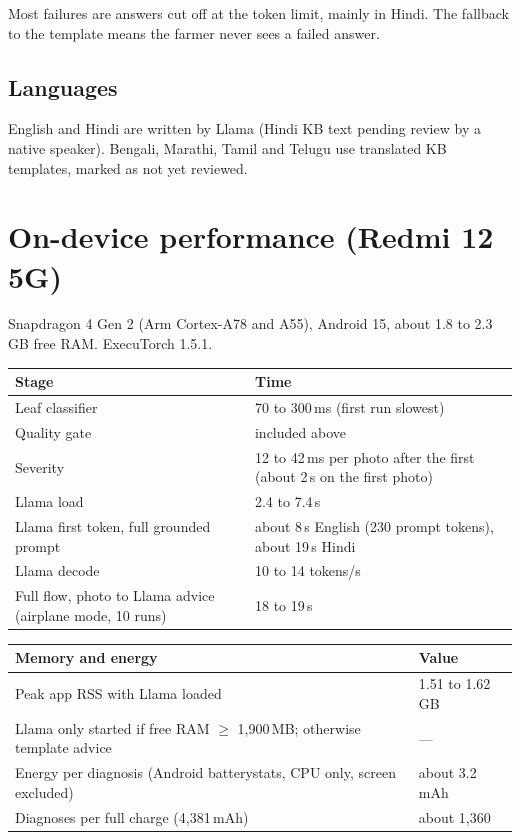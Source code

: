 \documentclass[11pt,a4paper]{article}
\newcommand{\hdr}[1]{\textbf{#1}}
\begin{document}
Most failures are answers cut off at the token limit, mainly in Hindi. The
fallback to the template means the farmer never sees a failed answer.

\subsection{Languages}

English and Hindi are written by Llama (Hindi KB text pending review by a native
speaker). Bengali, Marathi, Tamil and Telugu use translated KB templates, marked
as not yet reviewed.

\section{On-device performance (Redmi 12 5G)}

Snapdragon 4 Gen 2 (Arm Cortex-A78 and A55), Android 15, about 1.8 to 2.3\,GB free
RAM. ExecuTorch 1.5.1.

\begin{table}[H]
\centering
\begin{tabularx}{\textwidth}{@{}L l@{}}
\toprule
\hdr{Stage} & \hdr{Time} \\
\midrule
Leaf classifier & 70 to 300\,ms (first run slowest) \\
Quality gate & included above \\
Severity & 12 to 42\,ms per photo after the first (about 2\,s on the first photo) \\
Llama load & 2.4 to 7.4\,s \\
Llama first token, full grounded prompt & about 8\,s English (230 prompt tokens), about 19\,s Hindi \\
Llama decode & 10 to 14 tokens/s \\
Full flow, photo to Llama advice (airplane mode, 10 runs) & 18 to 19\,s \\
\bottomrule
\end{tabularx}
\end{table}

\begin{table}[H]
\centering
\begin{tabularx}{\textwidth}{@{}L l@{}}
\toprule
\hdr{Memory and energy} & \hdr{Value} \\
\midrule
Peak app RSS with Llama loaded & 1.51 to 1.62\,GB \\
Llama only started if free RAM $\geq$ 1,900\,MB; otherwise template advice & --- \\
Energy per diagnosis (Android batterystats, CPU only, screen excluded) & about 3.2\,mAh \\
Diagnoses per full charge (4,381\,mAh) & about 1,360 \\
\bottomrule
\end{tabularx}
\end{table}
\end{document}
